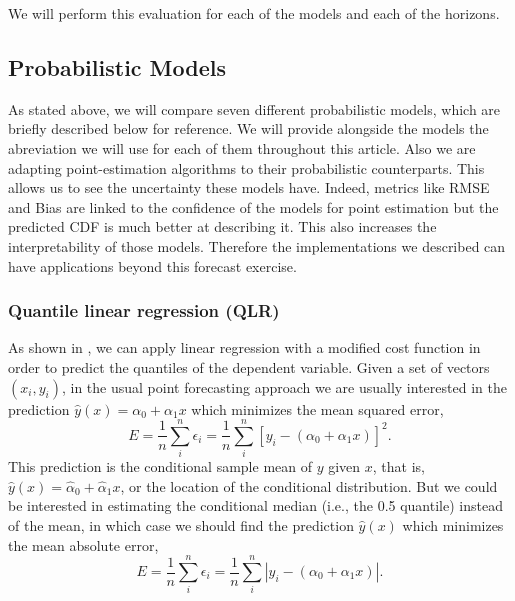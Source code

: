 \documentclass[a4paper,3p,sort&compress]{elsarticle}
\begin{document}
We will perform this evaluation for each of the models and each of the horizons.

\subsection{Probabilistic Models}
\label{sec:models}

As stated above, we will compare seven different probabilistic models,
which are briefly described below for reference. We will provide 
alongside the models the abreviation we will use for each of them 
throughout this article. Also we are adapting point-estimation 
algorithms to their probabilistic counterparts. This allows 
us to see the uncertainty these models have. Indeed, metrics like 
RMSE and Bias are linked to the confidence of the models for 
point estimation but the predicted CDF is much better at describing 
it. This also increases the interpretability of those models.
Therefore 
the implementations we described can have applications beyond 
this forecast exercise.

\subsubsection{Quantile linear regression (QLR)}

As shown in \cite{koenker_regression_1978}, we can apply linear
regression with a modified cost function in order to predict the
quantiles of the dependent variable.  Given a set of vectors
$(x_i, y_i)$, in the usual point forecasting approach we are usually
interested in the prediction $\hat y(x) = \alpha_0 + \alpha_1 x$ which
minimizes the mean squared error,
\begin{equation}
  \label{eq:1}
  E = \frac{1}{n} \sum^n_i \epsilon_i =
  \frac{1}{n} \sum^n_i [ y_i - (\alpha_0 + \alpha_1 x) ]^2.
\end{equation}
This prediction is the conditional sample mean of $y$ given $x$, that
is, $\hat y(x) = \hat\alpha_0 + \hat\alpha_1 x$, or the location of
the conditional distribution. But we could be interested in estimating
the conditional median (i.e., the 0.5 quantile) instead of the mean,
in which case we should find the prediction $\hat y(x)$ which
minimizes the mean absolute error,
\begin{equation}
  \label{eq:2}
  E = \frac{1}{n} \sum^n_i \epsilon_i =
  \frac{1}{n} \sum^n_i | y_i - (\alpha_0 + \alpha_1 x) |.
\end{equation}
\end{document}

